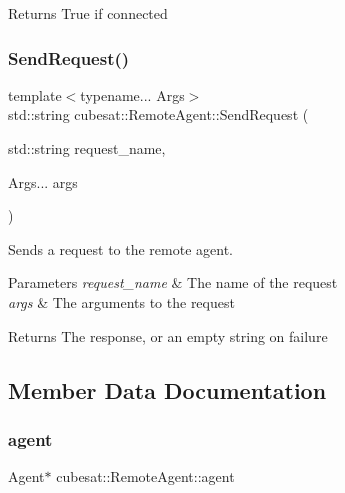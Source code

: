 \begin{DoxyReturn}{Returns}
True if connected 
\end{DoxyReturn}
\mbox{\label{classcubesat_1_1RemoteAgent_a480b864cabc5b9f5b69833a3bc1c1d2f}} 
\subsubsection{\texorpdfstring{Send\+Request()}{SendRequest()}}
{\footnotesize\ttfamily template$<$typename... Args$>$ \\
std\+::string cubesat\+::\+Remote\+Agent\+::\+Send\+Request (\begin{DoxyParamCaption}\item[{std\+::string}]{request\+\_\+name,  }\item[{Args...}]{args }\end{DoxyParamCaption})\hspace{0.3cm}{\ttfamily [inline]}}



Sends a request to the remote agent. 


\begin{DoxyParams}{Parameters}
{\em request\+\_\+name} & The name of the request \\
\hline
{\em args} & The arguments to the request \\
\hline
\end{DoxyParams}
\begin{DoxyReturn}{Returns}
The response, or an empty string on failure 
\end{DoxyReturn}


\subsection{Member Data Documentation}
\mbox{\label{classcubesat_1_1RemoteAgent_ab6ebf279927e308af1ecaf81782af2a3}} 
\subsubsection{\texorpdfstring{agent}{agent}}
{\footnotesize\ttfamily Agent$\ast$ cubesat\+::\+Remote\+Agent\+::agent\hspace{0.3cm}{\ttfamily [protected]}}



